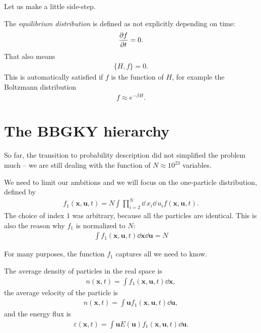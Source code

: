 Let us make a little side-step.

The \textit{equilibrium distribution} is defined as not explicitly depending on time:
\begin{align*}
\frac{\partial f}{\partial t} = 0.
\end{align*}
That also means
\begin{align*}
\big\{ H, f \big\} = 0.
\end{align*}
This is automatically satisfied if $f$ is the function of $H$, for example the Boltzmann distribution
\begin{align*}
f \approx e^{-\beta H}.
\end{align*}

\section{The BBGKY hierarchy}
So far, the transition to probability description did not simplified the problem much -- we are still dealing with the function of $N \approx 10^{23}$ variables.

We need to limit our ambitions and we will focus on the one-particle distribution, defined by
\begin{align*}
f_1(\bm{x},\bm{u},t) = N \int \prod_{i=2}^N \dd \, x_i \dd \, u_i f(\bm{x},\bm{u},t).
\end{align*}
The choice of index $1$ was arbitrary, because all the particles are identical. This is also the reason why $f_1$ is normalized to $N$:
\begin{align*}
\int f_1(\bm{x},\bm{u},t) \dd \bm{x} \dd \bm{u} = N
\end{align*}

For many purposes, the function $f_1$ captures all we need to know.

The average density of particles in the real space is
\begin{align*}
n(\bm{x},t) = \int f_1(\bm{x},\bm{u},t) \dd \bm{x},
\end{align*}
the average velocity of the particle is
\begin{align*}
n(\bm{x},t) = \int \bm{u} f_1(\bm{x},\bm{u},t) \dd \bm{u},
\end{align*}
and the energy flux is
\begin{align*}
\varepsilon(\bm{x},t) = \int \bm{u} E(\bm{u}) f_1(\bm{x},\bm{u},t) \dd \bm{u}.
\end{align*}

